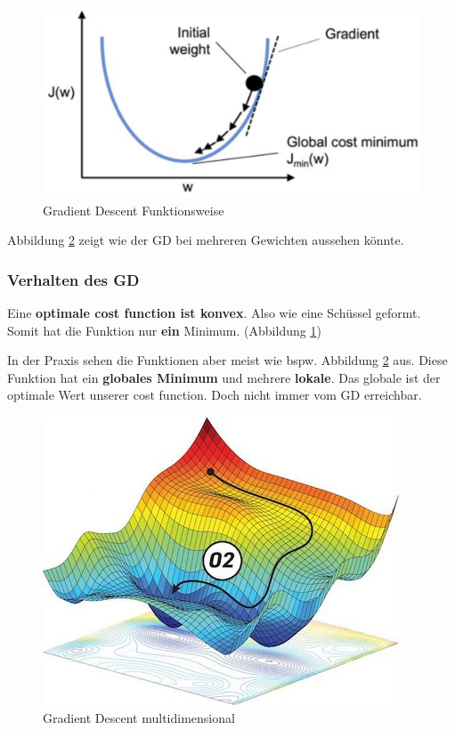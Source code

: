 \begin{figure}[h!]
	\includegraphics[scale=0.5]{figures/gradient_descent_simple}
	\caption{Gradient Descent Funktionsweise}
	\label{fig:gradient_descent_simple}
\end{figure}

Abbildung \ref{fig:gd_simple_multi} zeigt wie der GD bei mehreren Gewichten aussehen könnte.


\newpage
\subsubsection{Verhalten des GD}

Eine \textbf{optimale cost function ist konvex}. Also wie eine Schüssel geformt. Somit hat die Funktion nur \textbf{ein} Minimum. (Abbildung \ref{fig:gradient_descent_simple})


In der Praxis sehen die Funktionen aber meist wie
bspw. Abbildung \ref{fig:gd_simple_multi} aus. Diese Funktion hat ein \textbf{globales Minimum} und mehrere \textbf{lokale}. Das globale ist der optimale Wert unserer cost function. Doch nicht immer vom GD erreichbar.

\begin{figure}[h!]
	\includegraphics[scale=0.6]{figures/gd_simple_multi}
	\caption{Gradient Descent multidimensional}
	\label{fig:gd_simple_multi}
\end{figure}


